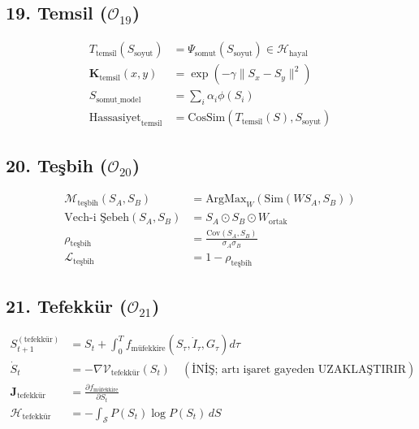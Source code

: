 \documentclass[11pt, a4paper]{article}
\begin{document}
\subsection{19. Temsil ($\mathcal{O}_{19}$)}
\begin{align}
T_{\text{temsil}}(S_{\text{soyut}}) &= \Psi_{\text{somut}}(S_{\text{soyut}}) \in \mathcal{H}_{\text{hayal}} \\
\mathbf{K}_{\text{temsil}}(x, y) &= \exp\left( -\gamma \|S_x - S_y\|^2 \right) \\
S_{\text{somut\_model}} &= \sum_i \alpha_i \phi(S_i) \\
\text{Hassasiyet}_{\text{temsil}} &= \text{CosSim}\left(T_{\text{temsil}}(S), S_{\text{soyut}}\right)
\end{align}

\subsection{20. Teşbih ($\mathcal{O}_{20}$)}
\begin{align}
\mathcal{M}_{\text{teşbih}}(S_A, S_B) &= \text{ArgMax}_{W} \left( \text{Sim}(W S_A, S_B) \right) \\
\text{Vech-i Şebeh}(S_A, S_B) &= S_A \odot S_B \odot W_{\text{ortak}} \\
\rho_{\text{teşbih}} &= \frac{\text{Cov}(S_A, S_B)}{\sigma_A \sigma_B} \\
\mathcal{L}_{\text{teşbih}} &= 1 - \rho_{\text{teşbih}}
\end{align}

\subsection{21. Tefekkür ($\mathcal{O}_{21}$)}
\begin{align}
S_{t+1}^{(\text{tefekkür})} &= S_t + \int_{0}^T f_{\text{müfekkire}}(S_\tau, \dot{I}_\tau, G_\tau) d\tau \\
\dot{S}_t &= -\nabla \mathcal{V}_{\text{tefekkür}}(S_t) \quad (\text{İNİŞ; artı işaret gayeden UZAKLAŞTIRIR}) \\
\mathbf{J}_{\text{tefekkür}} &= \frac{\partial f_{\text{müfekkire}}}{\partial S_t} \\
\mathcal{H}_{\text{tefekkür}} &= -\int_{\mathcal{S}} P(S_t) \log P(S_t) \, dS
\end{align}
\end{document}
